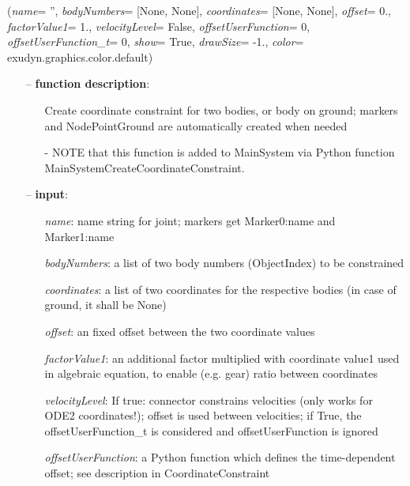 %
\begin{flushleft}
\label{sec:mainsystemextensions:CreateCoordinateConstraint}
({\it name}= '', {\it bodyNumbers}= [None, None], {\it coordinates}= [None, None], {\it offset}= 0., {\it factorValue1}= 1., {\it velocityLevel}= False, {\it offsetUserFunction}= 0, {\it offsetUserFunction\_t}= 0, {\it show}= True, {\it drawSize}= -1., {\it color}= exudyn.graphics.color.default)
\end{flushleft}
\setlength{\itemindent}{0.7cm}
\begin{itemize}[leftmargin=0.7cm]
\item[--]
{\bf function description}: \vspace{-6pt}
\begin{itemize}[leftmargin=1.2cm]
\setlength{\itemindent}{-0.7cm}
\item[]Create coordinate constraint for two bodies, or body on ground; markers and NodePointGround are automatically created when needed
\item[]- NOTE that this function is added to MainSystem via Python function MainSystemCreateCoordinateConstraint.
\end{itemize}
\item[--]
{\bf input}: \vspace{-6pt}
\begin{itemize}[leftmargin=1.2cm]
\setlength{\itemindent}{-0.7cm}
\item[]{\it name}: name string for joint; markers get Marker0:name and Marker1:name
\item[]{\it bodyNumbers}: a list of two body numbers (ObjectIndex) to be constrained
\item[]{\it coordinates}: a list of two coordinates for the respective bodies (in case of ground, it shall be None)
\item[]{\it offset}: an fixed offset between the two coordinate values
\item[]{\it factorValue1}: an additional factor multiplied with coordinate value1 used in algebraic equation, to enable (e.g. gear) ratio between coordinates
\item[]{\it velocityLevel}: If true: connector constrains velocities (only works for ODE2 coordinates!); offset is used between velocities; if True, the offsetUserFunction\_t is considered and offsetUserFunction is ignored
\item[]{\it offsetUserFunction}: a Python function which defines the time-dependent offset; see description in CoordinateConstraint

\end{itemize}
\end{itemize}
